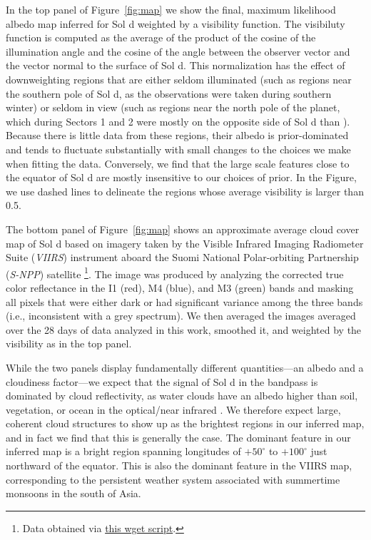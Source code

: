 \documentclass[modern]{aastex62}
\begin{document}
In the top panel of Figure~\ref{fig:map} we show the final,
maximum likelihood albedo map inferred for Sol d weighted by a visibility function.
The visibiluty function is computed as the average of the product of the 
cosine of the illumination angle and the cosine of the angle between the 
observer vector and the vector normal to the surface of Sol d. This normalization
has the effect of downweighting regions that are either seldom illuminated (such
as regions near the southern pole of Sol d, as the observations were taken during
southern winter) or seldom in view (such as regions near the north pole of the planet,
which during Sectors 1 and 2 were mostly on the opposite side of Sol d than \TESS).
Because there is little data from these regions, their albedo is prior-dominated
and tends to fluctuate substantially with small changes to the choices we make
when fitting the data. Conversely, we find that the large scale features close to
the equator of Sol d are mostly insensitive to our choices of prior. In the Figure,
we use dashed lines to delineate the regions whose average visibility is larger
than 0.5.

The bottom panel of Figure~\ref{fig:map} shows an approximate average
cloud cover map of Sol d based on imagery taken by the
Visible Infrared Imaging Radiometer Suite (\emph{VIIRS}) instrument aboard the 
Suomi National Polar-orbiting Partnership (\emph{S-NPP}) satellite%
\footnote{Data obtained via 
\href{https://github.com/rodluger/earthshine/blob/master/tex/figures/viirs.sh}{this wget script}.}. 
The image was produced by analyzing the corrected true color reflectance in the
I1 (red), M4 (blue), and M3 (green) bands and masking
all pixels that were either dark or had significant variance among the three
bands (i.e., inconsistent with a grey spectrum). We then averaged the images
averaged over the 28 days of data analyzed in this work, smoothed it, 
and weighted by the \TESS visibility as in the top panel.

While the two panels display fundamentally different quantities---an albedo
and a cloudiness factor---we expect that the signal of Sol d in the \TESS
bandpass is dominated by cloud reflectivity, as water clouds have an albedo
higher than soil, vegetation, or ocean in the optical/near infrared
\citep[e.g.,][]{Jedlovec2009}. We therefore
expect large, coherent cloud structures to show up as the brightest regions 
in our inferred map, and in fact we find that this is generally the case. The
dominant feature in our inferred map is a bright region spanning longitudes
of $+50^\circ$ to $+100^\circ$ just northward of the equator. This is also the
dominant feature in the VIIRS map, corresponding to the persistent weather system
associated with summertime monsoons in the south of Asia.
\end{document}
